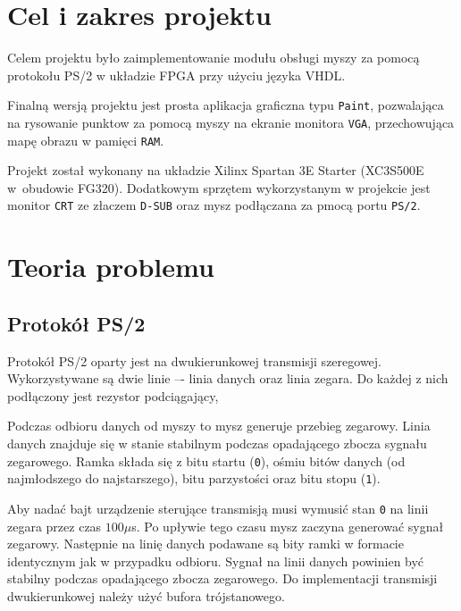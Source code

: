 \section{Cel i zakres projektu}
\label{sec:cel}

Celem projektu było zaimplementowanie modułu obsługi myszy za pomocą protokołu
PS/2 w układzie FPGA przy użyciu języka VHDL.
\vspace{1em}

Finalną wersją projektu jest prosta aplikacja graficzna typu \texttt{Paint}, pozwalająca
na rysowanie punktow za pomocą myszy na ekranie monitora \texttt{VGA}, przechowująca 
mapę obrazu w pamięci \texttt{RAM}.
\vspace{1em}

Projekt został wykonany na układzie Xilinx Spartan 3E Starter (XC3S500E
w~obudowie FG320). Dodatkowym sprzętem wykorzystanym w projekcie jest monitor \texttt{CRT}
ze złaczem \texttt{D-SUB} oraz mysz podłączana za pmocą portu \texttt{PS/2}.

\section{Teoria problemu}
\label{sec:teoria}
\subsection{Protokół PS/2}
Protokół PS/2 oparty jest na dwukierunkowej transmisji szeregowej.
Wykorzystywane są dwie linie –- linia danych oraz linia zegara. Do każdej z nich
podłączony jest rezystor podciągający,
\vspace{1em}

Podczas odbioru danych od myszy to mysz generuje przebieg zegarowy. Linia danych
znajduje się w stanie stabilnym podczas opadającego zbocza sygnału zegarowego.
Ramka składa się z bitu startu (\texttt{0}), ośmiu bitów danych (od najmłodszego
do najstarszego), bitu parzystości oraz bitu stopu (\texttt{1}).
\vspace{1em}

Aby nadać bajt urządzenie sterujące transmisją musi wymusić stan \texttt{0} na
linii zegara przez czas $100 \mu$s. Po upływie tego czasu mysz zaczyna generować
sygnał zegarowy. Następnie na linię danych podawane są bity ramki w formacie
identycznym jak w przypadku odbioru. Sygnał na linii danych powinien być
stabilny podczas opadającego zbocza zegarowego. Do implementacji transmisji
dwukierunkowej należy użyć bufora trójstanowego.
\vspace{1em}

